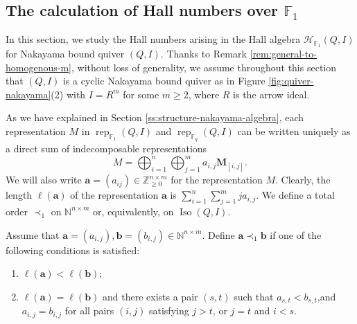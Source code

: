 \documentclass[12pt]{amsart}
\theoremstyle{remark}
\theoremstyle{definition}
\numberwithin{equation}{section}
\newcommand{\opname}{\operatorname}
\begin{document}
\subsection{The calculation of Hall numbers over $\mathbb{F}_1$}
In this section, we study the Hall numbers arising in the Hall algebra $\mathcal{H}_{\mathbb{F}_1}(Q,I)$ for  Nakayama bound quiver $(Q,I)$. Thanks to Remark \ref{rem:general-to-homogenous-m}, without loss of generality, we assume throughout this section that $(Q,I)$ is a cyclic Nakayama bound quiver as in Figure \ref{fig:quiver-nakayama}(2) with $I=R^m$ for some $m \ge 2$, where $R$ is the arrow ideal.

As we have explained in Section \ref{ss:structure-nakayama-algebra}, each representation ${M}$ in $\operatorname{rep}_{\mathbb{F}_1}(Q,I)$ and $\operatorname{rep}_{\mathbb{F}_q}(Q,I)$ can be written
uniquely as a direct sum of indecomposable representations
\[
{M}=\bigoplus_{i=1}^{n} \bigoplus_{j=1}^{m}a_{i,j}\mathbf{M}_{[i,j]}. 
\]
We will also write $\mathbf{a}=(a_{ij})\in \mathbb{Z}_{\geq 0}^{n\times m}$ for the representation ${M}$. Clearly, the length $\ell(\mathbf{a})$ of the representation $\mathbf{a}$ is $\sum_{i=1}^{n}\sum_{j=1}^mja_{i,j}$.
We define a total order $\prec_{1}$ on $\mathbb{N}^{n\times m}$ or, equivalently, on $\opname{Iso}(Q,I)$.


Assume that
$\mathbf{a}=(a_{i,j}),\mathbf{b}=(b_{i,j})\in \mathbb{N}^{n\times m}$.
Define $\mathbf{a}\prec_{1}\mathbf{b}$ if one of the following conditions is satisfied:
\begin{enumerate}
    \item
    $\ell(\mathbf{a})
    <
    \ell(\mathbf{b})$;
    \item
    $\ell(\mathbf{a})
    =
    \ell(\mathbf{b})$
    and there exists a pair $(s,t)$ such that
    $a_{s,t}<b_{s,t}$,and $ a_{i,j}=b_{i,j}$
    for all pairs $(i,j)$ satisfying
    $j>t$, or $j=t$  and  $ i<s$.
\end{enumerate}
\end{document}
